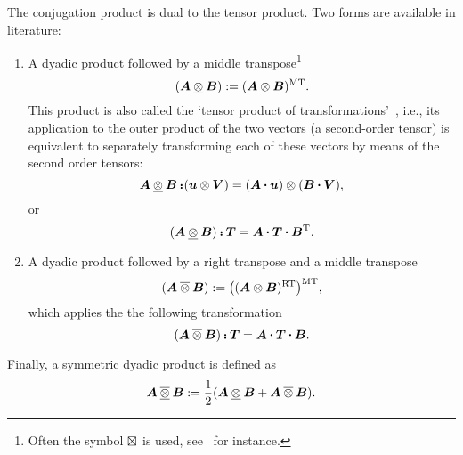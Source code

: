 \begin{definition}
    The conjugation product is dual to the tensor product. Two forms are available in literature: 
    \begin{enumerate}
    \item A dyadic product followed by a middle transpose\footnote{Often the symbol $\mathbin{\boxtimes}$ is used, see~\autocite{Guidugli.2000} for instance.}
        \begin{equation}
            (\tenb{A}\dyadu\tenb{B})\equidef(\tenb{A}\dyad\tenb{B})^\mtran.
        \end{equation}
        This product is also called the `tensor product of transformations'~\autocite{Halmos.1974}, i.e., its application to the outer product of the two vectors (a second-order tensor) is equivalent to separately transforming each of these vectors by means of the second order tensors:
        \begin{equation}
        \tenb{A}\dyadu\tenb{B}\dscp(\tena{u}\dyad\tenb{v})= (\tenb{A}\scp\tena{u})
        \dyad(\tenb{B}\scp\tenb{v}),
        \end{equation}
        or
        \begin{equation}
        (\tenb{A}\dyadu\tenb{B})\dscp\tenb{T}= \tenb{A}\scp\tenb{T}\scp\tenb{B}^\tran.
        \end{equation}        
    \item A dyadic product followed by a right transpose and a middle transpose
        \begin{equation}
            (\tenb{A}\dyado\tenb{B})\equidef\big((\tenb{A}\dyad\tenb{B})^\rtran\big)^\mtran,
        \end{equation}
        which applies the the following transformation
        \begin{equation}%
        (\tenb{A}\dyado\tenb{B})\dscp\tenb{T}= \tenb{A}\scp\tenb{T}\scp\tenb{B}.
        \end{equation}              
    \end{enumerate}
	Finally, a symmetric dyadic product is defined as
        \begin{equation}
        \tenb{A}\dyadd\tenb{B}\equidef \frac{1}{2}(\tenb{A}\dyadu\tenb{B}+\tenb{A}\dyado\tenb{B}).
        \end{equation}              	
\end{definition}



